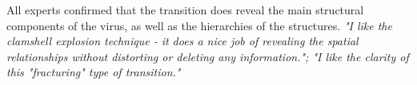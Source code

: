 









All experts confirmed that the transition does reveal the main structural components of the virus, as well as the hierarchies of the structures. %
\textit{"I like the clamshell explosion technique - it does a nice job of revealing the spatial relationships without distorting or deleting any information."; "I like the clarity of this "fracturing" type of transition."}

